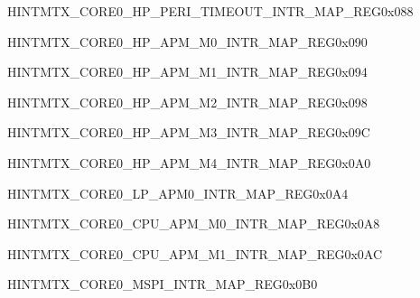 \begin{register}{H}{INTMTX\_CORE0\_HP\_PERI\_TIMEOUT\_INTR\_MAP\_REG}{0x088}\label{regdesc:INTMTXCORE0HPPERITIMEOUTINTRMAPREG} \end{register}\vspace{-3em}
\begin{register}{H}{INTMTX\_CORE0\_HP\_APM\_M0\_INTR\_MAP\_REG}{0x090}\label{regdesc:INTMTXCORE0HPAPMM0INTRMAPREG} \end{register}\vspace{-3em}
\begin{register}{H}{INTMTX\_CORE0\_HP\_APM\_M1\_INTR\_MAP\_REG}{0x094}\label{regdesc:INTMTXCORE0HPAPMM1INTRMAPREG} \end{register}\vspace{-3em}
\begin{register}{H}{INTMTX\_CORE0\_HP\_APM\_M2\_INTR\_MAP\_REG}{0x098}\label{regdesc:INTMTXCORE0HPAPMM2INTRMAPREG} \end{register}\vspace{-3em}
\begin{register}{H}{INTMTX\_CORE0\_HP\_APM\_M3\_INTR\_MAP\_REG}{0x09C}\label{regdesc:INTMTXCORE0HPAPMM3INTRMAPREG} \end{register}\vspace{-3em}
\begin{register}{H}{INTMTX\_CORE0\_HP\_APM\_M4\_INTR\_MAP\_REG}{0x0A0}\label{regdesc:INTMTXCORE0HPAPMM4INTRMAPREG} \end{register}\vspace{-3em}
\begin{register}{H}{INTMTX\_CORE0\_LP\_APM0\_INTR\_MAP\_REG}{0x0A4}\label{regdesc:INTMTXCORE0LPAPM0INTRMAPREG} \end{register}\vspace{-3em}
\begin{register}{H}{INTMTX\_CORE0\_CPU\_APM\_M0\_INTR\_MAP\_REG}{0x0A8}\label{regdesc:INTMTXCORE0CPUAPMM0INTRMAPREG} \end{register}\vspace{-3em}
\begin{register}{H}{INTMTX\_CORE0\_CPU\_APM\_M1\_INTR\_MAP\_REG}{0x0AC}\label{regdesc:INTMTXCORE0CPUAPMM1INTRMAPREG} \end{register}\vspace{-3em}
\begin{register}{H}{INTMTX\_CORE0\_MSPI\_INTR\_MAP\_REG}{0x0B0}\label{regdesc:INTMTXCORE0MSPIINTRMAPREG} \end{register}\vspace{-3em}
